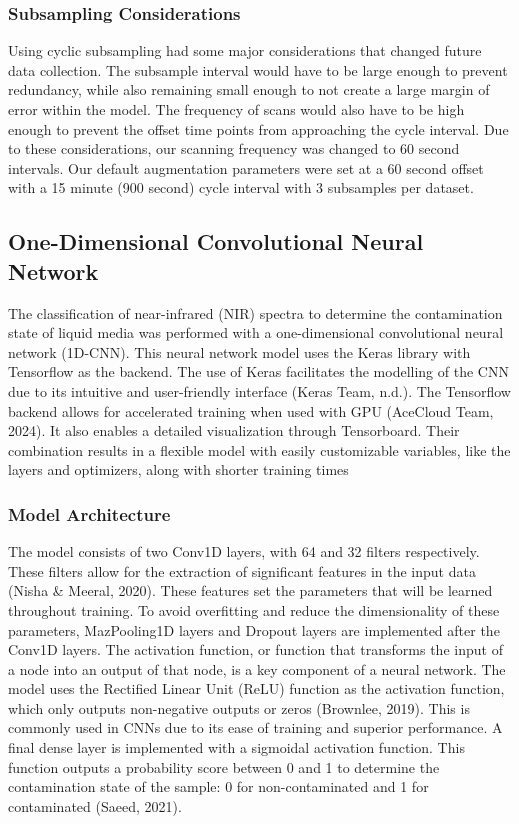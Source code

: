 \documentclass[final, 3p, 11pt]{elsarticle}
\begin{document}
\subsubsection{Subsampling Considerations}
Using cyclic subsampling had some major considerations that changed future data collection. The subsample interval would have to be large enough to prevent redundancy, while also remaining small enough to not create a large margin of error within the model. The frequency of scans would also have to be high enough to prevent the offset time points from approaching the cycle interval. Due to these considerations, our scanning frequency was changed to 60 second intervals. Our default augmentation parameters were set at a 60 second offset with a 15 minute (900 second) cycle interval with 3 subsamples per dataset. 

\subsection{One-Dimensional Convolutional Neural Network}
The classification of near-infrared (NIR) spectra to determine the contamination state of liquid media was performed with a one-dimensional convolutional neural network (1D-CNN). This neural network model uses the Keras library with Tensorflow as the backend. The use of Keras facilitates the modelling of the CNN due to its intuitive and user-friendly interface (Keras Team, n.d.). The Tensorflow backend allows for accelerated training when used with GPU (AceCloud Team, 2024). It also enables a detailed visualization through Tensorboard. Their combination results in a flexible model with easily customizable variables, like the layers and optimizers, along with shorter training times

\subsubsection{Model Architecture}
The model consists of two Conv1D layers, with 64 and 32 filters respectively. These filters allow for the extraction of significant features in the input data (Nisha \& Meeral, 2020). These features set the parameters that will be learned throughout training. To avoid overfitting and reduce the dimensionality of these parameters, MazPooling1D layers and Dropout layers are implemented after the Conv1D layers. The activation function, or function that transforms the input of a node into an output of that node, is a key component of a neural network. The model uses the Rectified Linear Unit (ReLU) function as the activation function, which only outputs non-negative outputs or zeros (Brownlee, 2019). This is commonly used in CNNs due to its ease of training and superior performance. A final dense layer is implemented with a sigmoidal activation function. This function outputs a probability score between 0 and 1 to determine the contamination state of the sample: 0 for non-contaminated and 1 for contaminated (Saeed, 2021).
\end{document}
